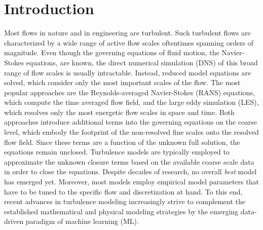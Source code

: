 \section{Introduction}
\label{sec:introduction}


Most flows in nature and in engineering are turbulent.
Such turbulent flows are characterized by a wide range of active flow scales oftentimes spanning orders of magnitude.
Even though the governing equations of fluid motion, the Navier-Stokes equations, are known, the direct numerical simulation (DNS) of this broad range of flow scales is usually intractable.
Instead, reduced model equations are solved, which consider only the most important scales of the flow.
The most popular approaches are the Reynolds-averaged Navier-Stokes (RANS) equations, which compute the time averaged flow field, and the large eddy simulation (LES), which resolves only the most energetic flow scales in space and time.
Both approaches introduce additional terms into the governing equations on the coarse level, which embody the footprint of the non-resolved fine scales onto the resolved flow field.
Since these terms are a function of the unknown full solution, the equations remain unclosed.
Turbulence models are typically employed to approximate the unknown closure terms based on the available coarse scale data in order to close the equations.
Despite decades of research, no overall \textit{best} model has emerged yet.
Moreover, most models employ empirical model parameters that have to be tuned to the specific flow and discretization at hand.
To this end, recent advances in turbulence modeling increasingly strive to complement the established mathematical and physical modeling strategies by the emerging data-driven paradigm of machine learning (ML).

